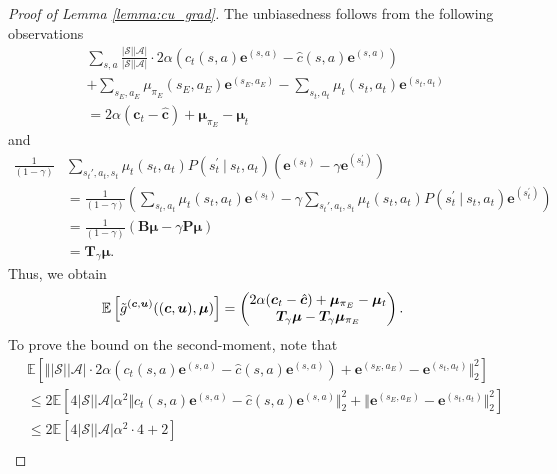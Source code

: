 \documentclass[10pt,a4paper]{amsart}
\def\Ac{\ensuremath{\mathcal{A}}}
\newcommand{\E}{\mathbb{E}}
\newcommand{\St}{\mathcal{S}}
\def\evc{{c}}
\def\evmu{{\mu}}
\def\mB{{\bm{B}}}
\def\mP{{\bm{P}}}
\def\mTg{{\bm{T}}_\gamma}
\def\vc{{\bm{c}}}
\def\ve{{\bm{e}}}
\def\vmu{{\bm{\mu}}}
\def\vu{{\bm{u}}}
\begin{document}
\begin{proof}[Proof of Lemma \ref{lemma:cu_grad}]
        The unbiasedness follows from the following observations
        \begin{align*}
            &\sum\limits_{s,a}\frac{|\St||\Ac|}{|\St||\Ac|}\cdot 2\alpha\left(\evc_t(s,a)\ve^{(s,a)}-\hat{\evc}(s,a)\ve^{(s,a)}\right)\\
            &+\sum\limits_{s_E,a_E} \evmu_{\pi_E}(s_E,a_E)\ve^{(s_E,a_E)} - \sum\limits_{s_t,a_t}\evmu_t(s_t,a_t)\ve^{(s_t,a_t)}\\
            &= 2\alpha(\vc_t - \hat{\vc}) + \vmu_{\pi_E} - \vmu_t
        \end{align*}
        and
        \begin{align*}
            \frac{1}{(1-\gamma)} &\sum\limits_{s_t',a_t,s_t} \evmu_t(s_t,a_t)P(s^\prime_t\:|\:s_t,a_t)(\ve^{(s_t)} - \gamma \ve^{(s_t^\prime)})\\
            &= \frac{1}{(1-\gamma)}\left(\sum\limits_{s_t,a_t}\evmu_t(s_t,a_t)\ve^{(s_t)} -\gamma \sum\limits_{s_t',a_t,s_t} \evmu_t(s_t,a_t)P(s^\prime_t\:|\:s_t,a_t) \ve^{(s_t^\prime)} \right)\\
            &= \frac{1}{(1-\gamma)}(\mB\vmu - \gamma\mP\vmu)\\
            &= \mTg\vmu.
        \end{align*}
        Thus, we obtain
        \begin{align*}
        \E\left[ \Tilde{g}^{(\vc,\vu)}((\vc,\vu),\vmu) \right] &=                                                 \begin{pmatrix}
                    2\alpha(\vc_t-\hat{\vc}) + \vmu_{\pi_E} - \vmu_t \\
                    \mTg\vmu - \mTg\vmu_{\pi_E}
                    \end{pmatrix}.
        \end{align*}
        To prove the bound on the second-moment, note that
        \begin{align*}
            &\E\left[\Big\Vert |\St||\Ac|\cdot 2\alpha\left(\evc_t(s,a)\ve^{(s,a)}-\hat{\evc}(s,a)\ve^{(s,a)}\right) + \ve^{(s_E,a_E)} - \ve^{(s_t,a_t)}\Big\Vert_2^2\right] \\
            &\leq 2\E\left[4|\St||\Ac|\alpha^2\Big\Vert\evc_t(s,a)\ve^{(s,a)}-\hat{\evc}(s,a)\ve^{(s,a)} \Big\Vert_2^2 + \Big\Vert \ve^{(s_E,a_E)} - \ve^{(s_t,a_t)}\Big\Vert_2^2\right]\\
            &\leq 2\E\left[4|\St||\Ac|\alpha^2\cdot4 + 2\right]\\

\end{align*}
\end{proof}
\end{document}

